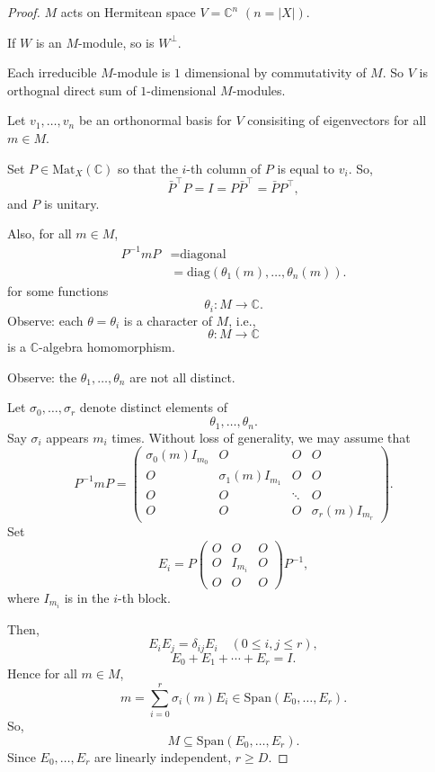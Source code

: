 \documentclass[
]{book}
\theoremstyle{definition}
\theoremstyle{definition}
\theoremstyle{definition}
\theoremstyle{definition}
\theoremstyle{remark}
\begin{document}
\begin{proof}
\(M\) acts on Hermitean space \(V = \mathbb{C}^n\) \((n = |X|)\).

If \(W\) is an \(M\)-module, so is \(W^\bot\).

Each irreducible \(M\)-module is \(1\) dimensional by commutativity of \(M\). So \(V\) is orthognal direct sum of \(1\)-dimensional \(M\)-modules.

Let \(v_1, \ldots, v_n\) be an orthonormal basis for \(V\) consisiting of eigenvectors for all \(m\in M\).

Set \(P\in \mathrm{Mat}_X(\mathbb{C})\) so that the \(i\)-th column of \(P\) is equal to \(v_i\). So,
\[\bar{P}^\top P = I = P\bar{P}^\top = \bar{P}P^\top,\]
and \(P\) is unitary.

Also, for all \(m\in M\),
\begin{align}
P^{-1}mP & = \text{diagonal}\\
& = \mathrm{diag}(\theta_1(m), \ldots, \theta_n(m)).
\end{align}
for some functions
\[\theta_i: M \longrightarrow \mathbb{C}.\]
Observe: each \(\theta = \theta_i\) is a character of \(M\), i.e.,
\[\theta: M\longrightarrow \mathbb{C}\]
is a \(\mathbb{C}\)-algebra homomorphism.

Observe: the \(\theta_1, \ldots, \theta_n\) are not all distinct.

Let \(\sigma_0, \ldots, \sigma_r\) denote distinct elements of
\[\theta_1, \ldots, \theta_n.\]
Say \(\sigma_i\) appears \(m_i\) times.
Without loss of generality, we may assume that
\[P^{-1}mP = \begin{pmatrix}\sigma_0(m)I_{m_0} & O & O &  O \\
O & \sigma_1(m)I_{m_1} & O &  O\\
O & O & \ddots & O \\
O & O & O & \sigma_r(m)I_{m_r}
\end{pmatrix}.\]
Set
\[E_i = P\begin{pmatrix} O & O & O\\
O & I_{m_i} & O\\
O & O & O \end{pmatrix}P^{-1},\]
where \(I_{m_i}\) is in the \(i\)-th block.

Then,
\[E_iE_j = \delta_{ij}E_i \quad (0\leq i,j\leq r),\]
\[E_0 + E_1 + \cdots + E_r = I.\]
Hence for all \(m\in M\),
\[m = \sum_{i=0}^r \sigma_i(m)E_i \in \mathrm{Span}(E_0, \ldots, E_r).\]
So,
\[M \subseteq \mathrm{Span}(E_0, \ldots, E_r).\]
Since \(E_0,\ldots, E_r\) are linearly independent, \(r\geq D\).


\end{proof}
\end{document}
